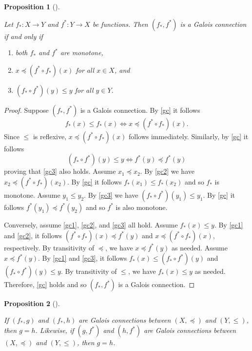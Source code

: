 \documentclass[
  twoside,
  12pt,
  letterpaper,
  fleqn]{article}
\providecommand{\tightlist}{%
  \setlength{\itemsep}{0pt}\setlength{\parskip}{0pt}}\usepackage{longtable,booktabs,array}
\theoremstyle{plain}
\newtheorem{proposition}{Proposition}[section]
\theoremstyle{definition}
\theoremstyle{definition}
\theoremstyle{remark}
\begin{document}
\begin{proposition}[]\protect\hypertarget{prp-galois-connection-if-and-only-if}{}\label{prp-galois-connection-if-and-only-if}

Let \(f_*:X\to Y\) and \(f^*:Y\to X\) be functions. Then \((f_*, f^*)\)
is a Galois connection if and only if

\begin{enumerate}
\def\labelenumi{\arabic{enumi}.}
\tightlist
\item
  both \(f_*\) and \(f^*\) are monotone,
\item
  \(x\preceq (f^*\circ f_*)(x)\) for all \(x\in X\), and
\item
  \((f_* \circ f^*)(y)\leqslant y\) for all \(y\in Y\).
\end{enumerate}

\end{proposition}

\begin{proof}

Suppose \((f_*, f^*)\) is a Galois connection. By \eqref{gc} it follows
\[
f_*(x)\leqslant f_*(x) \Longleftrightarrow x\preceq (f^*\circ f_*)(x). 
\] Since \(\leqslant\) is reflexive, \(x\preceq (f^*\circ f_*)(x)\)
follows immediately. Similarly, by \eqref{gc} it follows \[
(f_*\circ f^*)(y)\leqslant y \Longleftrightarrow f^*(y)\preceq f^*(y)
\] proving that \eqref{gc3} also holds. Assume \(x_1\preceq x_2\). By
\eqref{gc2} we have \(x_2\preceq (f^*\circ f_*)(x_2)\). By \eqref{gc} it
follows \(f_*(x_1)\leqslant f_*(x_2)\) and so \(f_*\) is monotone.
Assume \(y_1\leqslant y_2\). By \eqref{gc3} we have
\((f_*\circ f^*)(y_1)\leqslant y_1\). By \eqref{gc} it follows
\(f^*(y_1)\preceq f^*(y_2)\) and so \(f^*\) is also monotone.

Conversely, assume \eqref{gc1}, \eqref{gc2}, and \eqref{gc3} all hold.
Assume \(f_*(x)\leqslant y\). By \eqref{gc1} and \eqref{gc2}, it follows
\((f^*\circ f_*)(x)\preceq f^*(y)\) and \(x\preceq (f^*\circ f_*)(x)\),
respectively. By transitivity of \(\preceq\), we have
\(x\preceq f^*(y)\) as needed. Assume \(x\preceq f^*(y)\). By
\eqref{gc1} and \eqref{gc3}, it follows
\(f_*(x)\leqslant (f_*\circ f^*)(y)\) and
\((f_*\circ f^*)(y)\leqslant y\). By transitivity of \(\leqslant\), we
have \(f_*(x)\leqslant y\) as needed. Therefore, \eqref{gc} holds and so
\((f_*, f^*)\) is a Galois connection.

\end{proof}

\begin{proposition}[]\protect\hypertarget{prp-galois-connections-uniqueness}{}\label{prp-galois-connections-uniqueness}

If \((f_*,g)\) and \((f_*, h)\) are Galois connections between
\((X,\preceq)\) and \((Y,\leqslant)\), then \(g=h\). Likewise, if
\((g, f^*)\) and \((h,f^*)\) are Galois connections between
\((X,\preceq)\) and \((Y,\leqslant)\), then \(g=h\).

\end{proposition}
\end{document}
